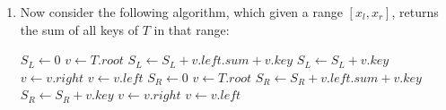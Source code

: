\documentclass[10pt, letterpaper]{article}
\begin{document}
\begin{enumerate}[label={\bfseries Q\arabic*.}]
\begin{enumerate}
      \item
        Now consider the following algorithm, which given a range $[x_l, x_r]$, returns the sum of all
        keys of $T$ in that range:
        \vspace{-5mm}
        \begin{center}
          \begin{minipage}{\linewidth}
            \begin{algorithm}[H]
              \caption{$\textsc{Range-Sum}(T,x_l,x_r)$}\label{alg:range-sum}
              \begin{algorithmic}[1]
                \State $S_L \gets 0$ 
                \State $v \gets T.root$
                      \State $S_L \gets S_L + v.left.sum + v.key$
                    \Else
                      \State $S_L \gets S_L + v.key$
                    \EndIf
                    \State $v \gets v.right$
                  \Else
                    \State $v \gets v.left$
                  \EndIf
                \EndWhile
                \State
                \State $S_R \gets 0$ 
                \State $v \gets T.root$
                      \State $S_R \gets S_R + v.left.sum + v.key$
                    \Else
                      \State $S_R \gets S_R + v.key$
                    \EndIf
                    \State $v \gets v.right$
                  \Else
                    \State $v \gets v.left$
                  \EndIf
                \EndWhile
                \State
                \State {} 
              \end{algorithmic}
            \end{algorithm}
          \end{minipage}
        \end{center}


\end{enumerate}
\end{enumerate}
\end{document}
